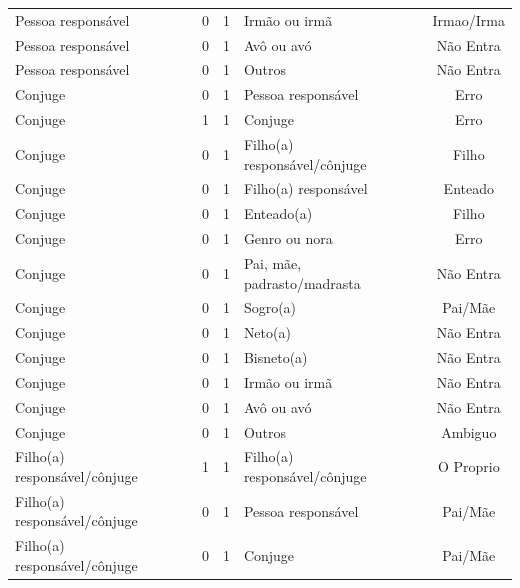 \documentclass[
	12pt,				%
	openright,			%
	twoside,			%
	a4paper,			%
	english,			%
	french,				%
	spanish,			%
	brazil				%
	]{abntex2}
\begin{document}
\begin{anexosenv}
\begin{longtable}{@{}lcclc@{}}
Pessoa responsável           & 0         & 1        & Irmão ou irmã                & Irmao/Irma      \\
Pessoa responsável           & 0         & 1        & Avô ou avó                   & Não Entra       \\
Pessoa responsável           & 0         & 1        & Outros                       & Não Entra       \\
Conjuge                      & 0         & 1        & Pessoa responsável           & Erro            \\
Conjuge                      & 1         & 1        & Conjuge                      & Erro            \\
Conjuge                      & 0         & 1        & Filho(a) responsável/cônjuge & Filho           \\
Conjuge                      & 0         & 1        & Filho(a) responsável         & Enteado         \\
Conjuge                      & 0         & 1        & Enteado(a)                   & Filho           \\
Conjuge                      & 0         & 1        & Genro ou nora                & Erro            \\
Conjuge                      & 0         & 1        & Pai, mãe, padrasto/madrasta  & Não Entra       \\
Conjuge                      & 0         & 1        & Sogro(a)                     & Pai/Mãe         \\
Conjuge                      & 0         & 1        & Neto(a)                      & Não Entra       \\
Conjuge                      & 0         & 1        & Bisneto(a)                   & Não Entra       \\
Conjuge                      & 0         & 1        & Irmão ou irmã                & Não Entra       \\
Conjuge                      & 0         & 1        & Avô ou avó                   & Não Entra       \\
Conjuge                      & 0         & 1        & Outros                       & Ambiguo         \\
Filho(a) responsável/cônjuge & 1         & 1        & Filho(a) responsável/cônjuge & O Proprio       \\
Filho(a) responsável/cônjuge & 0         & 1        & Pessoa responsável           & Pai/Mãe         \\
Filho(a) responsável/cônjuge & 0         & 1        & Conjuge                      & Pai/Mãe         \\

\end{longtable}
\end{anexosenv}
\end{document}
